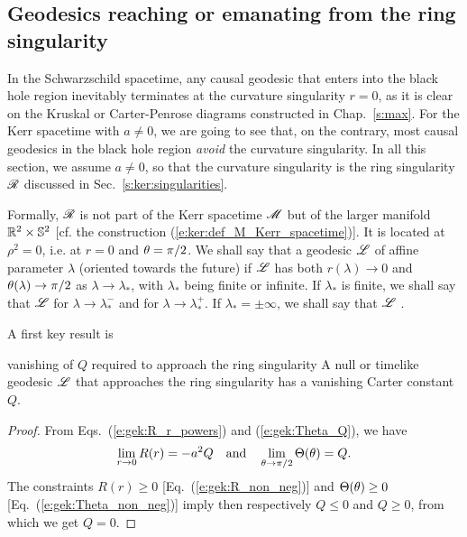 \subsection{Geodesics reaching or emanating from the ring singularity}

In the Schwarzschild spacetime, any causal geodesic that enters into the black
hole region inevitably terminates at the curvature singularity $r=0$, as it
is clear on the Kruskal or Carter-Penrose diagrams constructed in Chap.~\ref{s:max}.
For the Kerr spacetime with $a\neq 0$, we are going to see that, on the contrary,
most causal geodesics in the black hole region \emph{avoid} the curvature
singularity. In all this section, we assume $a\neq 0$, so that the
curvature singularity is the ring singularity $\mathscr{R}$
discussed in Sec.~\ref{s:ker:singularities}.

Formally, $\mathscr{R}$ is not
part of the Kerr spacetime $\mathscr{M}$ but of the larger manifold $\mathbb{R}^2\times\mathbb{S}^2$
[cf. the construction (\ref{e:ker:def_M_Kerr_spacetime})]. It is located
at $\rho^2 = 0$, i.e. at $r=0$ and
$\theta=\pi/2$. We shall say that a
geodesic $\mathscr{L}$ of affine parameter $\lambda$ (oriented towards the future)
if $\mathscr{L}$ has both
$r(\lambda)\to 0$ and $\theta(\lambda) \to \pi/2$ as $\lambda\to\lambda_*$, with
$\lambda_*$ being finite or infinite. If $\lambda_*$ is finite, we shall say
that $\mathscr{L}$ 
for $\lambda\to\lambda_*^-$ and
for $\lambda\to\lambda_*^+$. If $\lambda_*=\pm\infty$, we shall say
that $\mathscr{L}$ .

A first key result is
\begin{tprop}{vanishing of $Q$ required to approach the ring singularity}{}
A null or timelike geodesic $\mathscr{L}$ that approaches the ring singularity has
a vanishing Carter constant $Q$.
\end{tprop}

\begin{proof}
From Eqs.~(\ref{e:gek:R_r_powers}) and (\ref{e:gek:Theta_Q}), we have
\[
 \lim_{r\to 0} R(r) = - a^2 Q \quad\mbox{and}\quad
 \lim_{\theta\to \pi/2} \Theta(\theta) = Q .
\]
The constraints $R(r) \geq 0$ [Eq.~(\ref{e:gek:R_non_neg})]
and $\Theta(\theta)\geq 0$ [Eq.~(\ref{e:gek:Theta_non_neg})] imply then respectively
$Q \leq 0$ and $Q\geq 0$, from which we get $Q=0$.
\end{proof}

